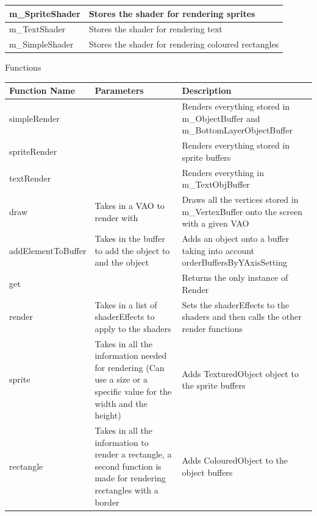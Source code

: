 \documentclass{article}
\begin{document}
\begin{center}
\begin{tabular}{ | m{} | m{} | }
                        m\_SpriteShader & Stores the shader for rendering sprites \\
                        \hline
                        m\_TextShader & Stores the shader for rendering text \\
                        \hline
                        m\_SimpleShader & Stores the shader for rendering coloured rectangles \\
                        \hline
                    \end{tabular}
                    Functions
                    \begin{tabular}{ | m{} | m{}| m{} | }
                        \hline
                        \textbf{Function Name} & \textbf{Parameters} & \textbf{Description} \\
                        \hline
                        simpleRender & & Renders everything stored in m\_ObjectBuffer and m\_BottomLayerObjectBuffer \\
                        \hline
                        spriteRender & & Renders everything stored in sprite buffers \\
                        \hline
                        textRender & & Renders everything in m\_TextObjBuffer \\
                        \hline
                        draw & Takes in a VAO to render with & Draws all the vertices stored in m\_VertexBuffer onto the screen with a given VAO \\
                        \hline
                        addElementToBuffer & Takes in the buffer to add the object to and the object & Adds an object onto a buffer taking into account orderBuffersByYAxisSetting \\
                        \hline
                        get & & Returns the only instance of Render \\
                        \hline
                        render & Takes in a list of shaderEffects to apply to the shaders & Sets the shaderEffects to the shaders and then calls the other render functions \\
                        \hline
                        sprite & Takes in all the information needed for rendering (Can use a size or a specific value for the width and the height) & Adds TexturedObject object to the sprite buffers \\
                        \hline
                        rectangle & Takes in all the information to render a rectangle, a second function is made for rendering rectangles with a border & Adds ColouredObject to the object buffers \\

\end{tabular}
\end{center}
\end{document}
